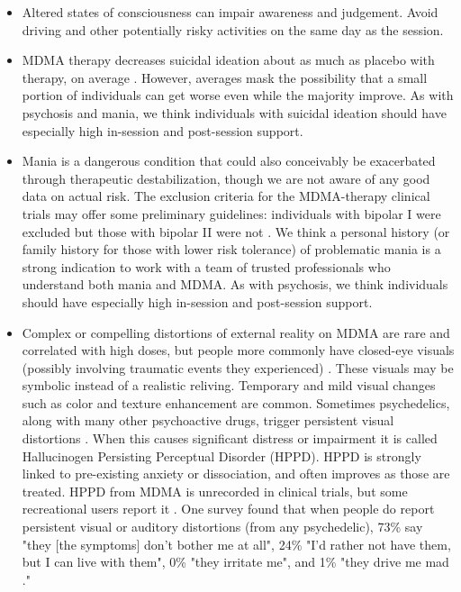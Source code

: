 \documentclass[12pt,letterpaper]{book}
\begin{document}
\begin{itemize}
    \item Altered states of consciousness can impair awareness and judgement. Avoid driving and other potentially risky activities on the same day as the session.
    \item MDMA therapy decreases suicidal ideation about as much as placebo with therapy, on average \cite{mitchellMDMAClinicalTrial,mitchellMDMAClinicalTrial2}. However, averages mask the possibility that a small portion of individuals can get worse even while the majority improve. As with psychosis and mania, we think individuals with suicidal ideation should have especially high in-session and post-session support. 
    \item Mania is a dangerous condition that could also conceivably be exacerbated through therapeutic destabilization, though we are not aware of any good data on actual risk. The exclusion criteria for the MDMA-therapy clinical trials may offer some preliminary guidelines: individuals with bipolar I were excluded but those with bipolar II were not \cite{mitchellMDMAClinicalTrial2}. We think a personal history (or family history for those with lower risk tolerance) of problematic mania is a strong indication to work with a team of trusted professionals who understand both mania and MDMA. As with psychosis, we think individuals should have especially high in-session and post-session support.
    \item Complex or compelling distortions of external reality on MDMA are rare and correlated with high doses, but people more commonly have closed-eye visuals (possibly involving traumatic events they experienced) \cite{liechtiGender}. These visuals may be symbolic instead of a realistic reliving. Temporary and mild visual changes such as color and texture enhancement are common. Sometimes psychedelics, along with many other psychoactive drugs, trigger persistent visual distortions \cite{alexanderHPPD,halpernHPPD}. When this causes significant distress or impairment it is called Hallucinogen Persisting Perceptual Disorder (HPPD). HPPD is strongly linked to pre-existing anxiety or dissociation, and often improves as those are treated. HPPD from MDMA is unrecorded in clinical trials, but some recreational users report it \cite{vizeliActuteEffects,litjensHPPD}. One survey found that when people do report persistent visual or auditory distortions (from any psychedelic), 73\% say "they [the symptoms] don't bother me at all", 24\% "I'd rather not have them, but I can live with them", 0\% "they irritate me", and 1\% "they drive me mad \cite{carhart2010user}."
\end{itemize}
\end{document}
